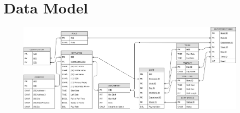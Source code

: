 \documentclass[letter,12pt]{texMemo}
\begin{document}
\newpage
\section*{Data Model}
\begin{figure}[H]
	\centering
	\includegraphics[angle=90, height=\textheight]{er_diag.png}
\end{figure}



%
%
\end{document}
